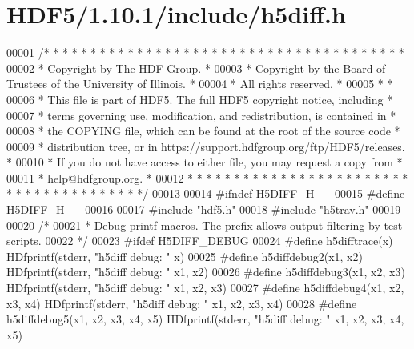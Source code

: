 \hypertarget{_h_d_f5_21_810_81_2include_2h5diff_8h_source}{}\section{H\+D\+F5/1.10.1/include/h5diff.h}
\label{_h_d_f5_21_810_81_2include_2h5diff_8h_source}

\begin{DoxyCode}
00001 \textcolor{comment}{/* * * * * * * * * * * * * * * * * * * * * * * * * * * * * * * * * * * * * * *}
00002 \textcolor{comment}{ * Copyright by The HDF Group.                                               *}
00003 \textcolor{comment}{ * Copyright by the Board of Trustees of the University of Illinois.         *}
00004 \textcolor{comment}{ * All rights reserved.                                                      *}
00005 \textcolor{comment}{ *                                                                           *}
00006 \textcolor{comment}{ * This file is part of HDF5.  The full HDF5 copyright notice, including     *}
00007 \textcolor{comment}{ * terms governing use, modification, and redistribution, is contained in    *}
00008 \textcolor{comment}{ * the COPYING file, which can be found at the root of the source code       *}
00009 \textcolor{comment}{ * distribution tree, or in https://support.hdfgroup.org/ftp/HDF5/releases.  *}
00010 \textcolor{comment}{ * If you do not have access to either file, you may request a copy from     *}
00011 \textcolor{comment}{ * help@hdfgroup.org.                                                        *}
00012 \textcolor{comment}{ * * * * * * * * * * * * * * * * * * * * * * * * * * * * * * * * * * * * * * */}
00013 
00014 \textcolor{preprocessor}{#ifndef H5DIFF\_H\_\_}
00015 \textcolor{preprocessor}{#define H5DIFF\_H\_\_}
00016 
00017 \textcolor{preprocessor}{#include "hdf5.h"}
00018 \textcolor{preprocessor}{#include "h5trav.h"}
00019 
00020 \textcolor{comment}{/*}
00021 \textcolor{comment}{ * Debug printf macros. The prefix allows output filtering by test scripts.}
00022 \textcolor{comment}{ */}
00023 \textcolor{preprocessor}{#ifdef H5DIFF\_DEBUG}
00024 \textcolor{preprocessor}{#define h5difftrace(x) HDfprintf(stderr, "h5diff debug: " x)}
00025 \textcolor{preprocessor}{#define h5diffdebug2(x1, x2) HDfprintf(stderr, "h5diff debug: " x1, x2)}
00026 \textcolor{preprocessor}{#define h5diffdebug3(x1, x2, x3) HDfprintf(stderr, "h5diff debug: " x1, x2, x3)}
00027 \textcolor{preprocessor}{#define h5diffdebug4(x1, x2, x3, x4) HDfprintf(stderr, "h5diff debug: " x1, x2, x3, x4)}
00028 \textcolor{preprocessor}{#define h5diffdebug5(x1, x2, x3, x4, x5) HDfprintf(stderr, "h5diff debug: " x1, x2, x3, x4, x5)}

\end{DoxyCode}
